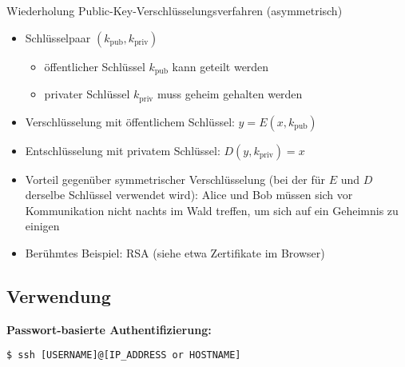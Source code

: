 Wiederholung Public-Key-Verschlüsselungsverfahren (asymmetrisch)
\begin{itemize}
	\item Schlüsselpaar $(k_\text{pub}, k_\text{priv})$
	\begin{itemize}
		\item öffentlicher Schlüssel $k_\text{pub}$ kann geteilt werden
		\item privater Schlüssel $k_\text{priv}$ muss geheim gehalten werden
	\end{itemize}
		\item Verschlüsselung mit öffentlichem Schlüssel: $y = E(x, k_\text{pub})$
\item Entschlüsselung mit privatem Schlüssel: $D(y, k_\text{priv}) = x$
\item Vorteil gegenüber symmetrischer Verschlüsselung (bei der für $E$ und $D$ derselbe Schlüssel verwendet wird): Alice und Bob müssen sich vor Kommunikation nicht nachts im Wald treffen, um sich auf ein Geheimnis zu einigen
\item Berühmtes Beispiel: RSA (siehe etwa Zertifikate im Browser)
\end{itemize}
%
%
\subsection{Verwendung}
\textbf{Passwort-basierte Authentifizierung:}
\begin{verbatim}
$ ssh [USERNAME]@[IP_ADDRESS or HOSTNAME]
\end{verbatim}

